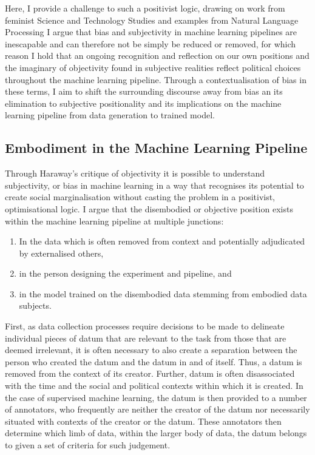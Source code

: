 Here, I provide a challenge to such a positivist logic, drawing on work from feminist Science and Technology Studies and examples from Natural Language Processing I argue that bias and subjectivity in machine learning pipelines are inescapable and can therefore not be simply be reduced or removed, for which reason I hold that an ongoing recognition and reflection on our own positions and the imaginary of objectivity found in subjective realities reflect political choices throughout the machine learning pipeline. Through a contextualisation of bias in these terms, I aim to shift the surrounding discourse away from bias an its elimination to subjective positionality and its implications on the machine learning pipeline from data generation to trained model.

\subsection{Embodiment in the Machine Learning Pipeline}
Through Haraway's \citet{Haraway:1988} critique of objectivity it is possible to understand subjectivity, or bias in machine learning in a way that recognises its potential to create social marginalisation without casting the problem in a positivist, optimisational logic. I argue that the disembodied or objective position exists within the machine learning pipeline at multiple junctions:
\begin{enumerate}
  \item{In the data which is often removed from context and potentially adjudicated by externalised others,}
  \item{in the person designing the experiment and pipeline, and}
  \item{in the model trained on the disembodied data stemming from embodied data subjects.}
\end{enumerate}
First, as data collection processes require decisions to be made to delineate individual pieces of datum that are relevant to the task from those that are deemed irrelevant, it is often necessary to also create a separation between the person who created the datum and the datum in and of itself. Thus, a datum is removed from the context of its creator. Further, datum is often disassociated with the time and the social and political contexts within which it is created. In the case of supervised machine learning, the datum is then provided to a number of annotators, who frequently are neither the creator of the datum nor necessarily situated with contexts of the creator or the datum. These annotators then determine which limb of data, within the larger body of data, the datum belongs to given a set of criteria for such judgement.

